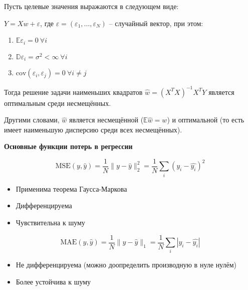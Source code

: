 \begin{theorem}
Пусть целевые значения выражаются в следующем виде:

\(Y = Xw + \varepsilon\), где 
\(\varepsilon = (\varepsilon_1, \ldots, \varepsilon_N)\) -- случайный вектор, при этом:

\begin{enumerate}
    \item \(\mathbb{E} \varepsilon_i = 0\ \forall i\)
    \item \(\mathbb{D} \varepsilon_i = \sigma^2 < \infty\ \forall i\)
    \item \(\text{cov}(\varepsilon_i, \varepsilon_j) = 0\ \forall i \neq j\)
\end{enumerate}

Тогда решение задачи наименьших квадратов 
$\widehat{w} = (X^T X)^{-1} X^T Y$ является оптимальным среди несмещённых.

Другими словами, $\widehat{w}$ является несмещённой (\(\mathbb{E} \widehat{w} = w\)) и оптимальной (то есть имеет наименьшую дисперсию среди всех несмещённых).

\textbf{Основные функции потерь в регрессии}

\[
\text{MSE}(y, \widehat{y}) = 
\frac{1}{N} \|y - \widehat{y}\|_2^2 = 
\frac{1}{N} \sum_i (y_i - \widehat{y_i})^2
\]

\begin{itemize}
    \item Применима теорема Гаусса-Маркова
    \item Дифференцируема
    \item Чувствительна к шуму
\end{itemize}

\[
\text{MAE}(y, \widehat{y}) = 
\frac{1}{N} \|y - \widehat{y}\|_1 = 
\frac{1}{N} \sum_i |y_i - \widehat{y_i}|
\]

\begin{itemize}
    \item Не дифференцируема (можно доопределить производную в нуле нулём)
    \item Более устойчива к шуму
\end{itemize}

\end{theorem}
